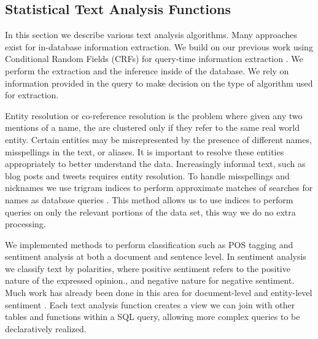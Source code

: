 \subsection{Statistical Text Analysis Functions}

In this section we describe various text analysis algorithms.
Many approaches exist for in-database information extraction. 
We build on our previous work using Conditional Random Fields (CRFs) for 
query-time information extraction \cite{wang2011hybrid}.
We perform the extraction and the inference inside of the database. 
We rely on information
provided in the query to make decision on the type of algorithm used 
for extraction. 

Entity resolution or co-reference resolution is the problem where given any two
mentions of a name, the are clustered only if they refer to the same real 
world entity. 
Certain entities may be misrepresented by the presence of different names, 
misspellings in the text, or aliases. It is important to
resolve these entities appropriately to better understand the data. Increasingly
informal text, such as blog posts and tweets requires entity resolution. 
To handle misspellings and nicknames we use trigram indices to perform 
approximate matches of searches for names as database queries 
\cite{Jain:2009:BQO:1519103.1519108}. 
This method allows us to use indices to perform queries on only the relevant
portions of the data set, this way we do no extra processing.

We implemented methods to perform classification such as POS tagging and 
sentiment analysis at both a document and sentence level.
In sentiment analysis we classify text by polarities, where positive
sentiment refers to the positive nature of the expressed opinion., and negative
nature for negative sentiment. Much work has already been done in this
area for document-level and entity-level sentiment \cite{o2010tweets,
zhang2011combining}. 
Each text analysis function creates a view we can join with other tables
and functions within a SQL query, allowing more complex queries to be 
declaratively realized. 


